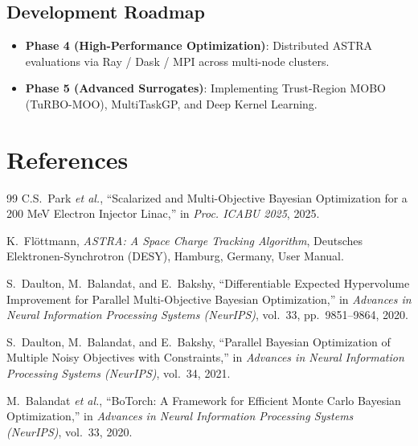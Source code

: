 \documentclass[11pt,a4paper]{article}
\begin{document}
\subsection{Development Roadmap}
\begin{itemize}
    \item \textbf{Phase 4 (High-Performance Optimization)}: Distributed ASTRA evaluations via Ray / Dask / MPI across multi-node clusters.
    \item \textbf{Phase 5 (Advanced Surrogates)}: Implementing Trust-Region MOBO (TuRBO-MOO), MultiTaskGP, and Deep Kernel Learning.
\end{itemize}

\section*{References}
\begin{thebibliography}{99}
C.S.~Park \textit{et al.}, ``Scalarized and Multi-Objective Bayesian Optimization for a 200 MeV Electron Injector Linac,'' in \textit{Proc. ICABU 2025}, 2025.

K.~Fl\"ottmann, \textit{ASTRA: A Space Charge Tracking Algorithm}, Deutsches Elektronen-Synchrotron (DESY), Hamburg, Germany, User Manual.

S.~Daulton, M.~Balandat, and E.~Bakshy, ``Differentiable Expected Hypervolume Improvement for Parallel Multi-Objective Bayesian Optimization,'' in \textit{Advances in Neural Information Processing Systems (NeurIPS)}, vol.~33, pp.~9851--9864, 2020.

S.~Daulton, M.~Balandat, and E.~Bakshy, ``Parallel Bayesian Optimization of Multiple Noisy Objectives with Constraints,'' in \textit{Advances in Neural Information Processing Systems (NeurIPS)}, vol.~34, 2021.

M.~Balandat \textit{et al.}, ``BoTorch: A Framework for Efficient Monte Carlo Bayesian Optimization,'' in \textit{Advances in Neural Information Processing Systems (NeurIPS)}, vol.~33, 2020.
\end{thebibliography}
\end{document}
